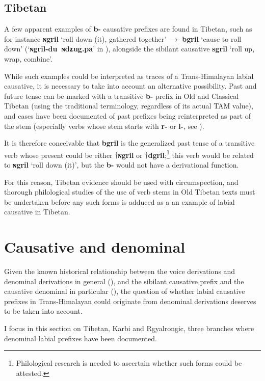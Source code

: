 \documentclass[oneside,a4paper,11pt]{article}
\newcommand{\ipa}[1]{\textbf{{\phon\mbox{#1}}}} %
\begin{document}
\subsection{Tibetan}
A few apparent examples of \ipa{b-} causative prefixes are found in Tibetan, such as for instance \ipa{ɴgril} `roll down (it), gathered together' $\rightarrow$ \ipa{bgril} `cause to roll down' (`\ipa{ɴgril-du ɴdʑug.pa}' in \citealt{bodrgya}), alongside the sibilant causative \ipa{sgril}  `roll up, wrap, combine'.

While such examples could be interpreted as traces of a Trans-Himalayan labial causative, it is necessary to take into account an alternative possibility. Past and future tense can be marked with a transitive \ipa{b-} prefix in Old and Classical Tibetan (using the traditional terminology, regardless of its actual TAM value), and cases have been documented of past prefixes being reinterpreted as part of the stem (especially verbs whose stem starts with \ipa{r-} or \ipa{l-}, see  \citet{hill05vbri, jacques10ndr, hill15lan}).

It is therefore conceivable that  \ipa{bgril} is the generalized past tense of a transitive verb whose present could be either $\dagger$\ipa{ɴgril} or $\dagger$\ipa{dgril};\footnote{Philological research is needed to ascertain whether such forms could be attested.} this verb would be related to \ipa{ɴgril} `roll down (it)', but the \ipa{b-} would not have a derivational function. 
 
For this reason, Tibetan evidence should be used with circumspection, and thorough philological studies of the use of verb stems in Old Tibetan texts must be undertaken before any such forms is adduced as a an example of labial causative in Tibetan.

\section{Causative and denominal} \label{sec:denominal}
Given the known historical relationship between the voice derivations and denominal derivations in general (\citealt{jacques14antipassive}), and the sibilant causative prefix and the causative denominal in particular (\citealt{jacques15causative}), the question of whether labial causative prefixes in Trans-Himalayan could originate from denominal derivations deserves to be taken into account.


I focus in this section on Tibetan, Karbi and Rgyalrongic, three branches where denominal labial prefixes have been documented.
\end{document}

